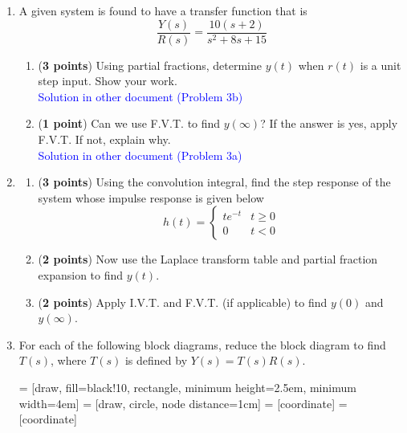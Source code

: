 \documentclass[]{article}
\begin{document}
\begin{enumerate}
    \item A given system is found to have a transfer function that is
    $$\frac{Y(s)}{R(s)}=\frac{10(s+2)}{s^2+8s+15}$$
    \begin{enumerate}
        \item (\textbf{3 points}) Using partial fractions, determine $y(t)$ when $r(t)$ is a unit step input. Show your work.\\
        \textcolor{blue}{Solution in other document (Problem 3b)}
        \item (\textbf{1 point}) Can we use F.V.T. to find $y(\infty)$? If the answer is yes, apply F.V.T. If not, explain why.\\
        \textcolor{blue}{Solution in other document (Problem 3a)}
    \end{enumerate}
    \vspace{0.4 cm}

    \item
    \begin{enumerate}
        \item (\textbf{3 points}) Using the convolution integral, find the step response of the system whose impulse response is given below
        \[
            h(t)=
            \begin{cases}
                te^{-t} & t \geq 0\\
                0       & t < 0
            \end{cases}
        \]
        \item (\textbf{2 points}) Now use the Laplace transform table and partial fraction expansion to find $y(t)$.
        \item (\textbf{2 points}) Apply I.V.T. and F.V.T. (if applicable) to find $y(0)$ and $y(\infty)$.
    \end{enumerate}
    \vspace{0.4 cm}

    \item For each of the following block diagrams, reduce the block diagram to find $T(s)$, where $T(s)$ is defined by $Y(s)=T(s)R(s)$.
    
     = [draw, fill=black!10, rectangle, minimum height=2.5em, minimum width=4em]
     = [draw, circle, node distance=1cm]
     = [coordinate]
     = [coordinate]
    

\end{enumerate}
\end{document}
